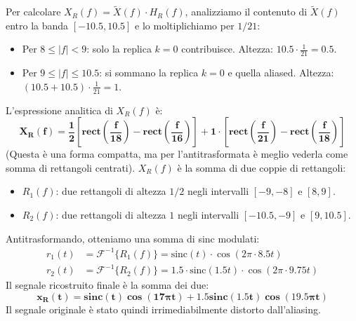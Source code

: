 \begin{soluzione}{21}
\begin{enumerate}
        Per calcolare $X_R(f) = \tilde{X}(f) \cdot H_R(f)$, analizziamo il contenuto di $\tilde{X}(f)$ entro la banda $[-10.5, 10.5]$ e lo moltiplichiamo per $1/21$:
        \begin{itemize}
            \item Per $8 \le |f| < 9$: solo la replica $k=0$ contribuisce. Altezza: $10.5 \cdot \frac{1}{21} = 0.5$.
            \item Per $9 \le |f| \le 10.5$: si sommano la replica $k=0$ e quella aliased. Altezza: $(10.5 + 10.5) \cdot \frac{1}{21} = 1$.
        \end{itemize}
        L'espressione analitica di $X_R(f)$ è:
        \[
            \mathbf{X_R(f) = \frac{1}{2}\left[\text{rect}\left(\frac{f}{18}\right) - \text{rect}\left(\frac{f}{16}\right)\right] + 1 \cdot \left[\text{rect}\left(\frac{f}{21}\right) - \text{rect}\left(\frac{f}{18}\right)\right]}
        \]
        (Questa è una forma compatta, ma per l'antitrasformata è meglio vederla come somma di rettangoli centrati).
        $X_R(f)$ è la somma di due coppie di rettangoli:
        \begin{itemize}
            \item $R_1(f)$: due rettangoli di altezza $1/2$ negli intervalli $[-9, -8]$ e $[8, 9]$.
            \item $R_2(f)$: due rettangoli di altezza $1$ negli intervalli $[-10.5, -9]$ e $[9, 10.5]$.
        \end{itemize}
        Antitrasformando, otteniamo una somma di sinc modulati:
        \begin{align*}
            r_1(t) &= \mathcal{F}^{-1}\{R_1(f)\} = \text{sinc}(t) \cdot \cos(2\pi \cdot 8.5t) \\
            r_2(t) &= \mathcal{F}^{-1}\{R_2(f)\} = 1.5 \cdot \text{sinc}(1.5t) \cdot \cos(2\pi \cdot 9.75t)
        \end{align*}
        Il segnale ricostruito finale è la somma dei due:
        \[
            \mathbf{x_R(t) = \text{sinc}(t)\cos(17\pi t) + 1.5\text{sinc}(1.5t)\cos(19.5\pi t)}
        \]
        Il segnale originale è stato quindi irrimediabilmente distorto dall'aliasing.
        
    \end{enumerate}
\end{soluzione}